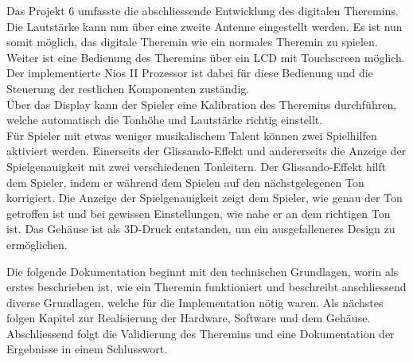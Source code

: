 Das Projekt 6 umfasste die abschliessende Entwicklung des digitalen Theremins. Die Lautstärke kann nun über eine zweite Antenne eingestellt werden. Es ist nun somit möglich, das digitale Theremin wie ein normales Theremin zu spielen.\\
Weiter ist eine Bedienung des Theremins über ein LCD mit Touchscreen möglich. Der implementierte Nios II Prozessor ist dabei für diese Bedienung und die Steuerung der restlichen Komponenten zuständig.\\
Über das Display kann der Spieler eine Kalibration des Theremins durchführen, welche automatisch die Tonhöhe und Lautstärke richtig einstellt.\\
Für Spieler mit etwas weniger musikalischem Talent können zwei Spielhilfen aktiviert werden. Einerseits der Glissando-Effekt und andererseits die Anzeige der Spielgenauigkeit mit zwei verschiedenen Tonleitern. Der Glissando-Effekt hilft dem Spieler, indem er während dem Spielen auf den nächstgelegenen Ton korrigiert. Die Anzeige der Spielgenauigkeit zeigt dem Spieler, wie genau der Ton getroffen ist und bei gewissen Einstellungen, wie nahe er an dem richtigen Ton ist.
Das Gehäuse ist als 3D-Druck entstanden, um ein ausgefalleneres Design zu ermöglichen.


Die folgende Dokumentation beginnt mit den technischen Grundlagen, worin als erstes beschrieben ist, wie ein Theremin funktioniert und beschreibt anschliessend diverse Grundlagen, welche für die Implementation nötig waren. Als nächstes folgen Kapitel zur Realisierung der Hardware, Software und dem Gehäuse. Abschliessend folgt die Validierung des Theremins und eine Dokumentation der Ergebnisse in einem Schlusswort.






